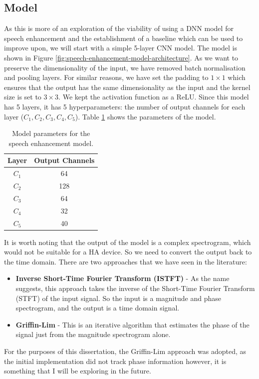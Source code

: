\documentclass[logo,bsc,singlespacing,parskip,online]{infthesis}
\begin{document}
\subsection{Model}
As this is more of an exploration of the viability of using a DNN model for speech enhancement 
and the establishment of a baseline which can be used to improve upon, we will start 
with a simple 5-layer CNN model. The model is shown in Figure \ref{fig:speech-enhancement-model-architecture}.
As we want to preserve the dimensionality of the input, we 
have removed batch normalisation and pooling layers.
For similar reasons, we have set the padding to $1\times 1$ which ensures that the output has the same dimensionality as the input
and the kernel size is set to $3\times 3$. We kept the activation function as a ReLU.
Since this model has 5 layers, it has 5 hyperparameters: the number of output channels for each layer ($C_1, C_2, C_3, C_4, C_5$).
Table \ref{tab:speech-enhancement-model-params} shows the parameters of the model.

\begin{table}[h]
   \centering
   \begin{tabular}{|c|c|}
      \hline
      Layer & Output Channels \\
      \hline
      $C_1$ & 64 \\
      $C_2$ & 128 \\
      $C_3$ & 64 \\
      $C_4$ & 32 \\
      $C_5$ & 40 \\
      \hline
   \end{tabular}
   \caption{Model parameters for the speech enhancement model.}
   \label{tab:speech-enhancement-model-params}
\end{table}

It is worth noting that the output of the model is a complex spectrogram, which would 
not be suitable for a HA device. So we need to convert the output back to the time domain. 
There are two approaches that we have seen in the literature:
\begin{itemize}
   \item \textbf{Inverse Short-Time Fourier Transform (ISTFT)} - As the name suggests, this approach takes the inverse of the Short-Time Fourier Transform (STFT) of the input signal.
   So the input is a magnitude and phase spectrogram, and the output is a time domain signal. 
   \item \textbf{Griffin-Lim} - This is an iterative algorithm that estimates the phase of the signal just from the magnitude spectrogram alone. 
\end{itemize}
For the purposes of this dissertation, the Griffin-Lim approach was adopted, as the initial implementation did not track phase information however,
it is something that I will be exploring in the future.
\end{document}
